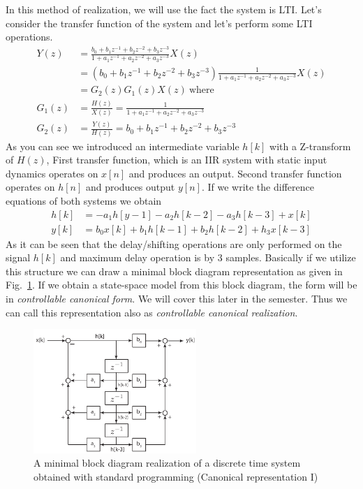 \documentclass[twoside]{article}
\begin{document}
In this method of realization, we will use the fact the system is
LTI. Let's consider the transfer function of the system and let's 
perform some LTI operations.
%
\begin{align*}
Y(z) &= \frac{b_0 + b_1 z^{-1} + b_2 z^{-2} + b_3 z^{-3}}{1+ a_1
       z^{-1} + a_2 z^{-2} + a_3 z^{-3}} X(z)
\\
&= \left( b_0 + b_1 z^{-1} + b_2 z^{-2} + b_3 z^{-3} \right) \frac{1}{1+ a_1
       z^{-1} + a_2 z^{-2} + a_3 z^{-3}} X(z) 
\\
&= G_2(z) G_1(z) X(z) \ \mathrm{where} 
\\
G_1(z) &= \frac{H(z)}{X(z)} = \frac{1}{1+ a_1
       z^{-1} + a_2 z^{-2} + a_3 z^{-3}} 
\\
G_2(z) &= \frac{Y(z)}{H(z)} = b_0 + b_1 z^{-1} + b_2 z^{-2} + b_3 z^{-3} 
\end{align*}
%
As you can see we introduced an intermediate variable $h[k]$ with a
Z-transform of $H(z)$, First transfer function, which is an IIR system
with static input dynamics operates on $x[n]$ and produces an output. 
Second transfer function operates on $h[n]$ and produces output
$y[n]$. If we write the difference equations of both systems we obtain
%
\begin{align*}
h[k] &= -a_1 h[y-1] - a_2 h[k-2] - a_3 h[k-3] + x[k] 
\\
y[k] &= b_0 x[k] + b_1 h[k-1] + b_2 h[k-2] + h_3 x[k-3] 
\end{align*}
%
As it can be seen that the delay/shifting operations are only
performed on the signal $h[k]$ and maximum delay operation 
is by 3 samples. Basically if we utilize this structure we can draw a
minimal block diagram representation as given in
Fig.~\ref{fig:standard}. If we obtain a state-space model from this block diagram, the form
will be in \textit{controllable canonical form}. We will cover this
later in the semester. Thus we can call this representation also as 
\textit{controllable canonical realization}. 
%
\begin{figure}[h]
    \centering
      \includegraphics[width=0.55\textwidth]{standard}
    \caption{A minimal block diagram realization of a discrete time
      system obtained with standard programming (Canonical
      representation I)}
        \label{fig:standard}
\end{figure}
\end{document}
